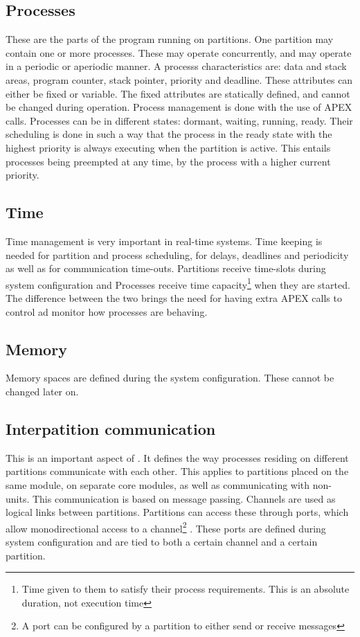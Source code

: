 \subsection{Processes}
These are the parts of the program running on partitions. One partition
may contain one or more processes. These may operate concurrently,
and may operate in a periodic or aperiodic manner. 
A process\textquotesingle s 
characteristics are: data and stack areas, program counter, stack pointer,
priority and deadline. These attributes can either be fixed 
or variable. The fixed attributes are statically defined, and cannot
be changed during operation.
\cite{arinc_page_19}
Process management is done with the use of APEX calls.
Processes can be in different states: dormant, waiting, running, ready.
Their scheduling is done in such a way that the process in the ready state
with the highest priority is always executing when the partition is active. 
This entails processes being preempted at any time, by the process with a 
higher current priority. 
\cite{arinc_page_20}

\subsection{Time}
Time management is very important in real-time systems.
Time keeping is needed for partition and process scheduling,
for delays, deadlines and periodicity as well as for communication time-outs.
Partitions receive time-slots during system configuration and
Processes receive time capacity\footnote{Time given to them to satisfy
their process requirements. This is an absolute duration, not execution time} when they are started.
The difference between the two brings the need for having extra APEX calls
to control ad monitor how processes are behaving.
\cite{arinc_page_25}

\subsection{Memory}
Memory spaces are defined during the system configuration. These cannot
be changed later on.

\subsection{Interpatition communication}
\label{ssec:interpart_comm}
This is an important aspect of \arinc{}. It defines the way processes residing on different partitions
communicate with each other. This applies to partitions placed 
on the same module, on separate core modules, as well as communicating with non-\arinc{} units.
This communication is based on message passing. Channels are used as
logical links between partitions. Partitions can access these through 
ports, which allow monodirectional access to a channel\footnote{
A port can be configured by a partition to either send or receive messages}
\cite{arinc_page_27}.
These ports are defined during system configuration and are tied to
both a certain channel and a certain partition.

